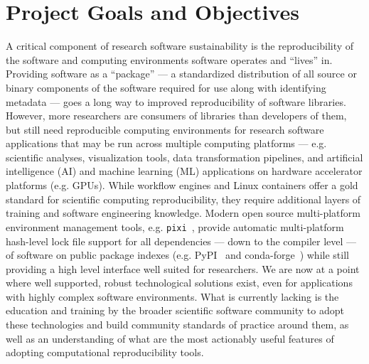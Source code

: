 \documentclass[letterpaper, 11pt]{article}
\newcommand{\pixi}{\texttt{pixi}}
\begin{document}
\pagestyle{fancy}

\section{Project Goals and Objectives}



A critical component of research software sustainability is the reproducibility of the software and computing environments software operates and ``lives'' in.
Providing software as a ``package'' --- a standardized distribution of all source or binary components of the software required for use along with identifying metadata --- goes a long way to improved reproducibility of software libraries.
However, more researchers are consumers of libraries than developers of them, but still need reproducible computing environments for research software applications that may be run across multiple computing platforms --- e.g. scientific analyses, visualization tools, data transformation pipelines, and artificial intelligence (AI) and machine learning (ML) applications on hardware accelerator platforms (e.g. GPUs).
While workflow engines and Linux containers offer a gold standard for scientific computing reproducibility, they require additional layers of training and software engineering knowledge.
Modern open source multi-platform environment management tools, e.g. \pixi{}~\cite{Arts_pixi}, provide automatic multi-platform hash-level lock file support for all dependencies --- down to the compiler level --- of software on public package indexes (e.g. PyPI~\cite{PyPI_website} and conda-forge~\cite{conda-forge_community}) while still providing a high level interface well suited for researchers.
We are now at a point where well supported, robust technological solutions exist, even for applications with highly complex software environments.
What is currently lacking is the education and training by the broader scientific software community to adopt these technologies and build community standards of practice around them, as well as an understanding of what are the most actionably useful features of adopting computational reproducibility tools.
\end{document}
